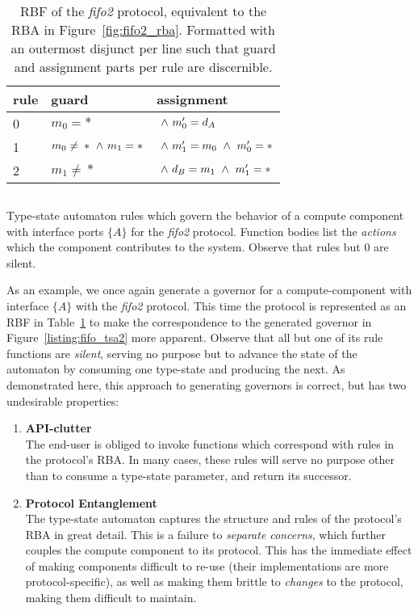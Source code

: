 \begin{table}
	\centering
	\begin{tabular}{l|ll|}
		rule & guard & assignment \\
		\hline
		0 & $m_0=*$ & $\ \wedge{}\ {}m_0'=d_A$\\
		1 & $m_0\neq{}*\ \wedge{}\ {}m_1=*$ & $\ \wedge{}\ {}m_1'=m_0\ \wedge{}\ {}m_0'=*$ \\
		2 & $m_1\neq{}*$ & $\ \wedge{}\ {}d_B=m_1\ \wedge{}\ {}m_1'=*$ \\
		\hline
	\end{tabular}
	\caption[RBF for the fifo2 connector.]{RBF of the \textit{fifo2} protocol, equivalent to the RBA in Figure~\ref{fig:fifo2_rba}. Formatted with an outermost disjunct per line such that guard and assignment parts per rule are discernible.}
	\label{tab:fifo2_rbf_tsa}
\end{table}

\begin{listing}[ht]
	\inputminted[]{rust}{fifo_tsa_2.rs}
	\caption[Type state automaton in Rust with silent rules.]{Type-state automaton rules which govern the behavior of a compute component with interface ports $\{A\}$ for the \textit{fifo2} protocol. Function bodies list the \textit{actions} which the component contributes to the system. Observe that rules but 0 are silent.}
	\label{listing:fifo_tsa2}
\end{listing}

As an example, we once again generate a governor for a compute-component with interface $\{A\}$ with the \textit{fifo2} protocol. This time the protocol is represented as an RBF in Table~\ref{tab:fifo2_rbf_tsa} to make the correspondence to the generated governor in Figure~\ref{listing:fifo_tsa2} more apparent. Observe that all but one of its rule functions are \textit{silent}, serving no purpose but to advance the state of the automaton by consuming one type-state and producing the next. As demonstrated here, this approach to generating governors is correct, but has two undesirable properties:
\begin{enumerate}
	\item \textbf{API-clutter}\\
	The end-user is obliged to invoke functions which correspond with rules in the protocol's RBA. In many cases, these rules will serve no purpose other than to consume a type-state parameter, and return its successor.
	
	\item \textbf{Protocol Entanglement}\\
	The type-state automaton captures the structure and rules of the protocol's RBA in great detail. This is a failure to \textit{separate concerns}, which further couples the compute component to its protocol. This has the immediate effect of making components difficult to re-use (their implementations are more protocol-specific), as well as making them brittle to \textit{changes} to the protocol, making them difficult to maintain. 
	
\end{enumerate}

